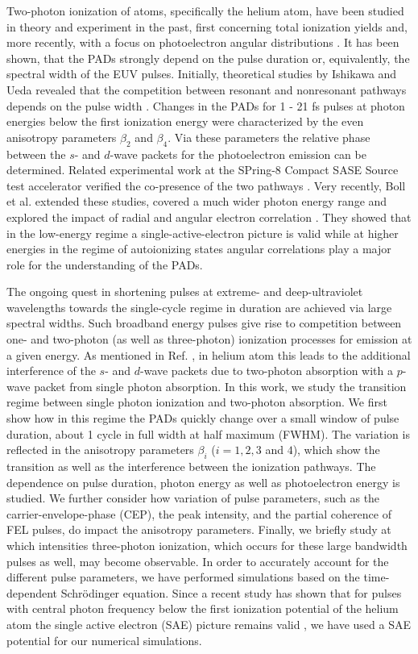 Two-photon ionization of atoms, specifically the helium atom, have been studied in theory and experiment in the past, first concerning total ionization yields  \cite{nikolopoulos01,vanderhart05,shakeshaft07,pi10,florescu11,sato11,florescu12} and, more recently, with a focus on photoelectron angular distributions \cite{ishikawa12,ishikawa13,ma13,boll19}. It has been shown, that the PADs strongly depend on the pulse duration or, equivalently, the spectral width of the EUV pulses. Initially, theoretical studies by Ishikawa and Ueda revealed that the competition between resonant and nonresonant pathways depends on the pulse width \cite{ishikawa12,ishikawa13}. Changes in the PADs for 1 - 21 fs pulses at photon energies below the first ionization energy were characterized by the even anisotropy parameters $\beta_2$ and $\beta_4$. Via these parameters the relative phase between the $s$- and $d$-wave packets for the photoelectron emission can be determined. Related experimental work at the SPring-8 Compact SASE Source test accelerator verified the co-presence of the two pathways \cite{ma13}. Very recently, Boll et al. extended these studies, covered a much wider photon energy range and explored the impact of radial and angular electron correlation \cite{boll19}. They showed that in the low-energy regime
a single-active-electron picture is valid while at higher energies in the regime of autoionizing states angular correlations play a major role for the understanding of the PADs.

The ongoing quest in shortening pulses at extreme- and deep-ultraviolet wavelengths towards the single-cycle regime in duration are achieved via large spectral widths. Such broadband energy pulses give rise to competition between one- and two-photon (as well as three-photon) ionization processes for emission at a given energy. As mentioned in Ref. \cite{boll19}, in helium atom this leads to the additional interference of the $s$- and $d$-wave packets due to two-photon absorption with a $p$-wave packet from single photon absorption. In this work, we study the transition regime between single photon ionization and two-photon absorption. We first show how in this regime the PADs quickly change over a small window of pulse duration, about 1 cycle in full width at half maximum (FWHM). The variation is reflected in the anisotropy parameters $\beta_i$ ($i = 1, 2, 3$ and $4$), which show the transition as well as the interference between the ionization pathways. The dependence on pulse duration, photon energy as well as photoelectron energy is studied. We further consider how variation of pulse parameters, such as the carrier-envelope-phase (CEP), the peak intensity, and the partial coherence of FEL pulses, do impact the anisotropy parameters. Finally, we briefly study at which intensities three-photon ionization, which occurs for these large bandwidth pulses as well, may become observable. In order to accurately account for the different pulse parameters, we have performed simulations based on the time-dependent Schr\"odinger equation. 
Since a recent study has shown that for pulses with central photon frequency below the first ionization potential of the helium atom the single active electron (SAE) picture remains valid \cite{boll19}, we have used a SAE potential for our numerical simulations. 


